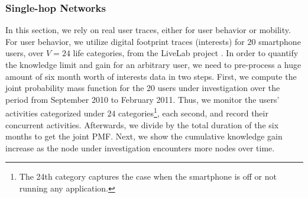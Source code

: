 \documentclass[12pt,epsf]{article}
\theoremstyle{definition}
\begin{document}
\subsubsection{Single-hop Networks}
\vspace{-0.2 cm}
%
%
In this section, we rely on real user traces, either for user behavior or mobility. For user behavior, we utilize digital footprint traces (interests) for $20$ smartphone users, over $V=24$ life categories, from the LiveLab project \cite{data}. 
In order to quantify the knowledge limit and gain for an arbitrary user, we need to pre-process a huge amount of six month worth of interests data in two steps. First, we compute the joint probability mass function for the 20 users under investigation over the period from September 2010 to February 2011. Thus, we monitor the users' activities categorized under $24$ categories\footnote{The 24th category captures the case when the smartphone is off or not running any application.}, each second, and record their concurrent activities. Afterwards, we divide by the total duration of the six months to get the joint PMF. Next, we show the cumulative knowledge gain increase as the node under investigation encounters more nodes over time.
\end{document}
